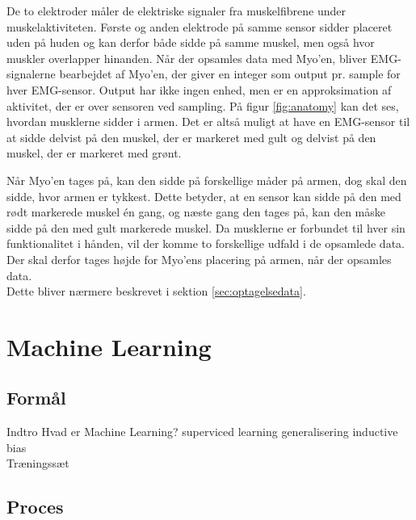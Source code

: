 De to elektroder måler de elektriske signaler fra muskelfibrene under muskelaktiviteten\citep{RefWorks:13}. Første og anden elektrode på samme sensor sidder placeret uden på huden og kan derfor både sidde på samme muskel, men også hvor muskler overlapper hinanden. Når der opsamles data med Myo'en, bliver EMG-signalerne bearbejdet af Myo'en, der giver en integer som output pr. sample for hver EMG-sensor. Output har ikke ingen enhed, men er en approksimation af aktivitet, der er over sensoren ved sampling. På figur \ref{fig:anatomy} kan det ses, hvordan musklerne sidder i armen. Det er altså muligt at have en EMG-sensor til at sidde delvist på den muskel, der er markeret med gult og delvist på den muskel, der er markeret med grønt.


Når Myo'en tages på, kan den sidde på forskellige måder på armen, dog skal den sidde, hvor armen er tykkest. Dette betyder, at en sensor kan sidde på den med rødt markerede muskel én gang, og næste gang den tages på, kan den måske sidde på den med gult markerede muskel. Da musklerne er forbundet til hver sin funktionalitet i hånden, vil der komme to forskellige udfald i de opsamlede data. Der skal derfor tages højde for Myo'ens placering på armen, når der opsamles data.\\
Dette bliver nærmere beskrevet i sektion \ref{sec:optagelsedata}.

\section{Machine Learning}
\label{sec:machineLearning}

\subsection{Formål}

Indtro
Hvad er Machine Learning?
superviced learning
generalisering
inductive bias
\\

Træningssæt 

\subsection{Proces}
